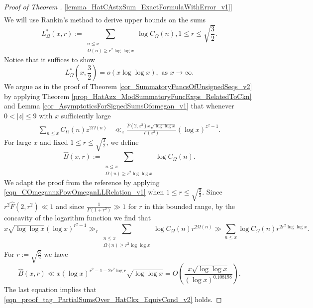 \documentclass[11pt,reqno,a4letter]{article}
\newcommand{\hlocalref}[1]{\hyperref[#1]{\ref{#1}}}
\numberwithin{equation}{section}
\numberwithin{figure}{section}
\numberwithin{table}{section}
\newcommand{\cf}{\textit{cf.\ }}
\theoremstyle{plain}
\numberwithin{theorem}{section}
\theoremstyle{definition}
\begin{document}
\begin{proof}[Proof of Theorem \hlocalref{lemma_HatCAstxSum_ExactFormulaWithError_v1}]
\begin{align*}
\end{align*}
We will use Rankin's method to derive upper bounds on the sums 
\[
L_{\Omega}^{\ast}(x, r) := \sum_{\substack{n \leq x \\ \Omega(n) \geq r^2 \log\log x}} 
	\log C_{\Omega}(n), 1 \leq r \leq \sqrt{\frac{3}{2}}. 
\]
Notice that it suffices to show 
\begin{equation}
\label{eqn_proof_tag_PartialSumsOver_HatCkx_EquivCond_v2}
L_{\Omega}^{\ast}\left(x, \frac{3}{2}\right) = o\left(x \log\log x\right), 
	\text{ as } x \rightarrow \infty. 
\end{equation}
We argue as in the proof of Theorem \hlocalref{cor_SummatoryFuncsOfUnsignedSeqs_v2} 
by applying Theorem \hlocalref{prop_HatAzx_ModSummatoryFuncExps_RelatedToCkn} and 
Lemma \hlocalref{cor_AsymptoticsForSignedSumsOfomegan_v1}
that whenever $0 < |z| \leq 9$ with $x$ sufficiently large 
\begin{align}
\label{eqn_COmegannzPowOmeganLLRelation_v1} 
\sum_{n \leq x} C_{\Omega}(n) z^{2\Omega(n)} & \ll_z 
     \frac{\widehat{F}(2, z^2) x \sqrt{\log\log x}}{\Gamma(z^2)} (\log x)^{z^2-1}. 
\end{align}
For large $x$ and fixed $1 \leq r \leq \sqrt{\frac{3}{2}}$, we define 
\[
\widehat{B}(x, r) := \sum_{\substack{n \leq x \\ \Omega(n) \geq r^2\log\log x}} 
     \log C_{\Omega}(n). 
\]
We adapt the proof from the reference \cite[\cf Thm.\ 7.20; \S 7.4]{MV} by 
applying \eqref{eqn_COmegannzPowOmeganLLRelation_v1} when $1 \leq r \leq \sqrt{\frac{3}{2}}$. 
Since $r^2 \widehat{F}(2, r^2) \ll 1$ and since 
$\frac{1}{\Gamma(1+r^2)} \gg 1$ for $r$ in this bounded range, by the concavity of the 
logarithm function we find that 
\[
x \sqrt{\log\log x} (\log x)^{r^2-1} \gg_r \sum_{\substack{n \leq x \\ \Omega(n) \geq r^2\log\log x}} 
     \log C_{\Omega}(n) r^{2\Omega(n)} \gg 
     \sum_{n \leq x} 
     \log C_{\Omega}(n) r^{2r^2 \log\log x}. 
\]
For $r := \sqrt{\frac{3}{2}}$ we have 
\begin{equation*}
\label{eqn_BHatxrUpperBound_v1}
\widehat{B}(x, r) \ll x (\log x)^{r^2-1-2r^2\log r} \sqrt{\log\log x} = 
     O\left(\frac{x \sqrt{\log\log x}}{(\log x)^{0.108198}}\right). 
\end{equation*}
The last equation implies that 
\eqref{eqn_proof_tag_PartialSumsOver_HatCkx_EquivCond_v2} holds. 
\end{proof} 
\end{document}

